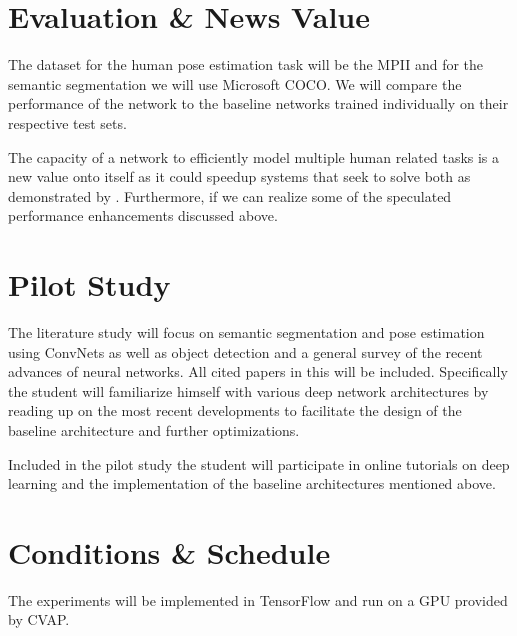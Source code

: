 \documentclass[a4paper,10pt]{article}
\begin{document}
\section{Evaluation \& News Value}
The dataset for the human pose estimation task will be the MPII\cite{Andriluka} and for the semantic segmentation we will use Microsoft COCO\cite{Lin2014}.  We will compare the performance of the network to the baseline networks trained individually on their respective test sets.  

The capacity of a network to efficiently model multiple human related tasks is a new value onto itself as it could speedup systems that seek to solve both as demonstrated by \cite{Ren2015}.  Furthermore, if we can realize some of the speculated performance enhancements discussed above.

\section{Pilot Study}
The literature study will focus on semantic segmentation and pose estimation using ConvNets as well as object detection and a general survey of the recent advances of neural networks.  All cited papers in this will be included.  Specifically the student will familiarize himself with various deep network architectures by reading up on the  most recent developments to facilitate the design of the baseline architecture and further optimizations.

Included in the pilot study the student will participate in online tutorials on deep learning and the implementation of the baseline architectures mentioned above.

 
\section{Conditions \& Schedule}
The experiments will be implemented in TensorFlow\cite{Abadi2015} and run on a GPU provided by CVAP.


\end{document}
